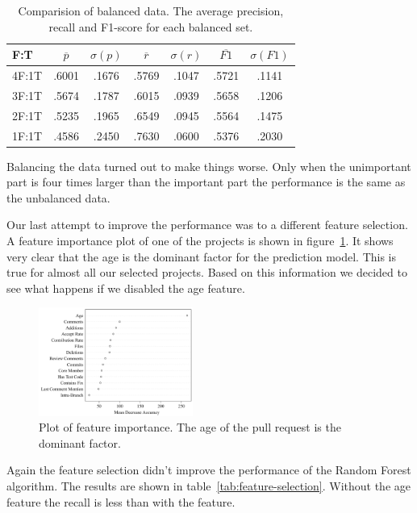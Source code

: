 \begin{table}
  \begin{tabular}{ l | c | c | c | c | c | c }
    F:T & $\overline{p}$ & $\sigma(p)$ & $\overline{r}$ & $\sigma(r)$ & $\overline{F1}$ & $\sigma(F1)$ \\ \hline
    \hline
    4F:1T & .6001 & .1676 & .5769 & .1047 & .5721 & .1141 \\ \hline
    3F:1T & .5674 & .1787 & .6015 & .0939 & .5658 & .1206 \\ \hline
    2F:1T & .5235 & .1965 & .6549 & .0945 & .5564 & .1475 \\ \hline
    1F:1T & .4586 & .2450 & .7630 & .0600 & .5376 & .2030 \\
  \end{tabular}
  \caption[Comparision of balanced data]{Comparision of balanced data. The average precision, recall and F1-score for each balanced set. }
  \label{tab:balance}
\end{table}

Balancing the data turned out to make things worse.
Only when the unimportant part is four times larger than the important part the performance is the same as the unbalanced data.

Our last attempt to improve the performance was to a different feature selection.
A feature importance plot of one of the projects is shown in figure~\ref{fig:feature-importance}.
It shows very clear that the age is the dominant factor for the prediction model.
This is true for almost all our selected projects.
Based on this information we decided to see what happens if we disabled the age feature.

\begin{figure}
  \centering
  \includegraphics[width=0.45\textwidth]{../figs/mean-decrease-accuracy.pdf}
  \caption[Plot of feature importance]
   {Plot of feature importance. The age of the pull request is the dominant factor.}
  \label{fig:feature-importance}
\end{figure}

Again the feature selection didn't improve the performance of the Random Forest algorithm.
The results are shown in table~\ref{tab:feature-selection}.
Without the age feature the recall is less than with the feature.

